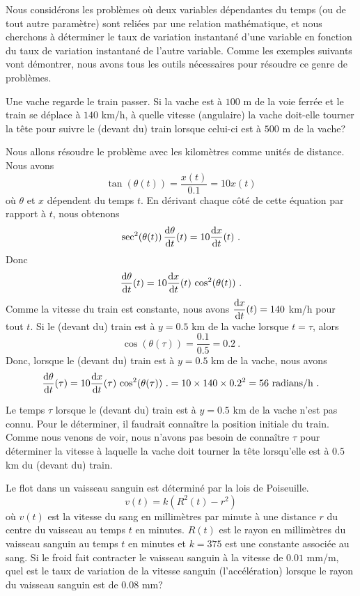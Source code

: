 {Nous considérons les problèmes où deux variables dépendantes du temps (ou
de tout autre paramètre) sont reliées par une relation mathématique, et
nous cherchons à déterminer le taux de variation instantané d'une variable
en fonction du taux de variation instantané de l'autre variable.
Comme les exemples suivants vont démontrer, nous avons tous les outils
nécessaires pour résoudre ce genre de problèmes.

\begin{egg}
Une vache regarde le train passer.  Si la vache est à $100$ m de la
voie ferrée et le train se déplace à $140$ km/h, à quelle vitesse
(angulaire) la vache doit-elle tourner la tête pour suivre le (devant
du) train lorsque celui-ci est à $500$ m de la vache?

Nous allons résoudre le problème avec les kilomètres comme unités de
distance.  Nous avons
\[
\tan(\theta(t)) = \frac{x(t)}{0.1} = 10 x(t)
\]
où $\theta$ et $x$ dépendent du temps $t$.  En dérivant chaque côté de
cette équation par rapport à $t$, nous obtenons
\[
\sec^2(\theta(t)) \, \frac{\mathrm{d}\theta}{\mathrm{d}t}(t) = 10 \frac{\mathrm{d}x}{\mathrm{d}t}(t) \ .
\]
Donc
\[
\frac{\mathrm{d}\theta}{\mathrm{d}t}(t) = 10 \frac{\mathrm{d}x}{\mathrm{d}t}(t) \, \cos^2(\theta(t)) \ .
\]
Comme la vitesse du train est constante, nous avons
$\displaystyle \frac{\mathrm{d}x}{\mathrm{d}t}(t) = 140$ km/h pour tout $t$.
Si le (devant du) train est à $y = 0.5$ km de la vache
lorsque $t=\tau$, alors
\[
\cos(\theta(\tau)) = \frac{0.1}{0.5} = 0.2 \ .
\]
Donc, lorsque le (devant du) train est à $y = 0.5$ km de la vache,
nous avons
\[
\frac{\mathrm{d}\theta}{\mathrm{d}t}(\tau) = 10 \frac{\mathrm{d}x}{\mathrm{d}t}(\tau) \, \cos^2(\theta(\tau)) \ .
= 10\times 140 \times 0.2^2 = 56 \ \text{radians/h} \ .
\]

Le temps $\tau$ lorsque le (devant du) train est à $y = 0.5$ km de la
vache n'est pas connu.  Pour le déterminer, il faudrait connaître la
position initiale du train.  Comme nous venons de voir, nous n'avons pas besoin
de connaître $\tau$ pour déterminer la vitesse à laquelle la vache
doit tourner la tête lorsqu'elle est à $0.5$ km du (devant du) train.
\end{egg}

\begin{egg}
Le flot dans un vaisseau sanguin est déterminé par la lois de
Poiseuille.
\[
v(t) = k( R^2(t) - r^2)
\]
où $v(t)$ est la vitesse du sang en millimètres par minute à une
distance $r$ du centre du vaisseau au temps $t$ en minutes.
$R(t)$ est le rayon en millimètres du vaisseau sanguin au temps $t$ en
minutes et $k=375$ est une constante associée au sang.  Si le froid
fait contracter le vaisseau sanguin à la vitesse de $0.01$ mm/m,
quel est le taux de variation de la vitesse sanguin (l'accélération)
lorsque le rayon du vaisseau sanguin est de $0.08$ mm?


\end{egg}}
